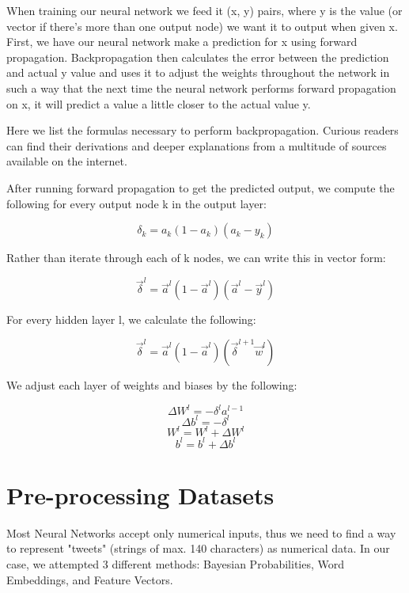 \documentclass[11pt,onecolumn]{article} %
\begin{document}
	When training our neural network we feed it (x, y) pairs, where y is the value (or vector if there's more than one output node) we want it to output when given x. First, we have our neural network make a prediction for x using forward propagation. Backpropagation then calculates the error between the prediction and actual y value and uses it to adjust the weights throughout the network in such a way that the next time the neural network performs forward propagation on x, it will predict a value a little closer to the actual value y.
	
	Here we list the formulas necessary to perform backpropagation. Curious readers can find their derivations and deeper explanations from a multitude of sources available on the internet.
	
	After running forward propagation to get the predicted output, we compute the following for every output node k in the output layer:
	
	\[ \delta_k = a_k(1-a_k)(a_k - y_k)\]
	
	Rather than iterate through each of k nodes, we can write this in vector form:
	
	\[ \vec \delta^l = \vec a^l(1-\vec a^l)(\vec a^l -\vec y^l)\]
	
	For every hidden layer l, we calculate the following:
	
	\[ \vec \delta^l = \vec a^l(1-\vec a^l)(\vec \delta^{l+1} \vec w^l)\]
	
	We adjust each layer of weights and biases by the following:
	
	\[ \Delta W^l =  -\delta^l a^{l-1}\]
	\[ \Delta b^l =  -\delta^l\]
	\[ W^l =  W^l + \Delta W^l \]
	\[ b^l =  b^l + \Delta b^l\]
	
	
	\section{Pre-processing Datasets}
	Most Neural Networks accept only numerical inputs, thus we need to find a way to represent "tweets" (strings of max. 140 characters) as numerical data. In our case, we attempted 3 different methods: Bayesian Probabilities, Word Embeddings, and Feature Vectors.
	
\end{document}
